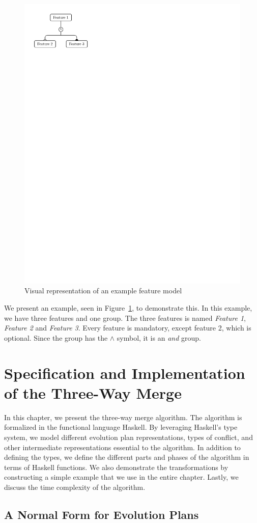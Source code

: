 \documentclass[a4paper,english]{ifimaster}
\begin{document}
\begin{figure}[htpb]
  \centering
  \includegraphics[width=0.4\linewidth]{visual_example.pdf}
  \caption{Visual representation of an example feature model}%
  \label{fig:visual_example}
\end{figure}

We present an example, seen in Figure~\ref{fig:visual_example}, to demonstrate this. In this example, we have three features and one group. The three features is named \textit{Feature 1}, \textit{Feature 2} and \textit{Feature 3}. Every feature is mandatory, except feature 2, which is optional. Since the group has the $\land$ symbol, it is an \textit{and} group.

\chapter{Specification and Implementation of the Three-Way Merge}%
\label{cha:specification_and_implementation_of_the_three_way_merge_algorithm}

In this chapter, we present the three-way merge algorithm. The algorithm is formalized in the functional language Haskell. By leveraging Haskell's type system, we model different evolution plan representations, types of conflict, and other intermediate representations essential to the algorithm. In addition to defining the types, we define the different parts and phases of the algorithm in terms of Haskell functions. We also demonstrate the transformations by constructing a simple example that we use in the entire chapter. Lastly, we discuss the time complexity of the algorithm.

\section{A Normal Form for Evolution Plans}%
\label{sec:defining_a_normal_form_for_evolution_plans}
\end{document}
